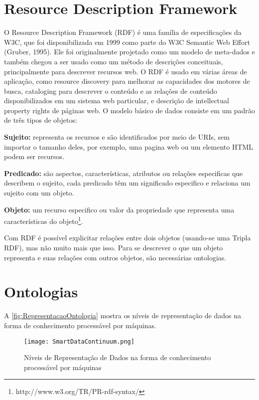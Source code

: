 \section{Resource Description Framework}

O Resource Description Framework (RDF) é uma família de especificações da W3C, que foi disponibilizada em 1999 como parte do W3C Semantic Web Effort (Gruber, 1995). Ele foi originalmente projetado como um modelo de meta-dados e também chegou a ser usado como um método de descrições conceituais, principalmente para descrever recursos web. O RDF é usado em várias áreas de aplicação, como resource discovery para melhorar as capacidades dos motores de busca, cataloging para descrever o conteúdo e as relações de conteúdo disponibilizados em um sistema web particular, e descrição de intellectual property rights de páginas web. O modelo básico de dados consiste em um padrão de três tipos de objetos: 

\textbf{Sujeito:} representa os recursos e são identificados por meio de URIs, sem importar o tamanho deles, por exemplo, uma pagina web ou um elemento HTML podem ser recursos.

\textbf{Predicado:} são aspectos, características, atributos ou relações especificas que describem o sujeito, cada predicado têm um significado especifico e relaciona um sujeito com um objeto.

\textbf{Objeto:} um recurso especifico ou valor da propriedade que representa uma características do objeto\footnote{http://www.w3.org/TR/PR-rdf-syntax/}. 

Com RDF é possível explicitar relações entre dois objetos (usando-se uma Tripla RDF), mas não muito mais que isso. Para se descrever o que um objeto representa e suas relações com outros objetos, são necessárias ontologias.

\section{Ontologias}

A \autoref{fig:RepresentacaoOntologia} mostra os níveis de representação de dados na forma de conhecimento processável por máquinas.

\begin{figure}[!htb]
    \centering
    \texttt{[image: SmartDataContinuum.png]}
    \caption{Níveis de Representação de Dados na forma de conhecimento processável por máquinas}
    \label{fig:RepresentacaoOntologia}
\end{figure}

